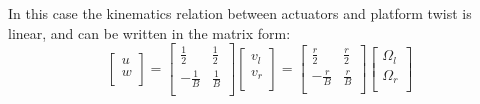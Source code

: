 In this case the kinematics relation between actuators and platform twist is linear, and can be written in the matrix form:
\begin{equation}
\label{eq:diff_drive_fwd_kinematics_matrix}
 \left[
 \begin{array}{c}
  u \\
  w \\
 \end{array}
 \right] = 
 \left[
 \begin{array}{cc}
  \frac{1}{2} & \frac{1}{2} \\
  -\frac{1}{B} & \frac{1}{B} \\
 \end{array}
 \right]
 \left[
 \begin{array}{c}
  v_l \\
  v_r \\
 \end{array}
 \right] = 
 \left[
 \begin{array}{cc}
  \frac{r}{2} & \frac{r}{2} \\
  -\frac{r}{B} & \frac{r}{B} \\
 \end{array}
 \right]
 \left[
 \begin{array}{c}
  \Omega_l \\
  \Omega_r \\
 \end{array}
 \right]
\end{equation}

